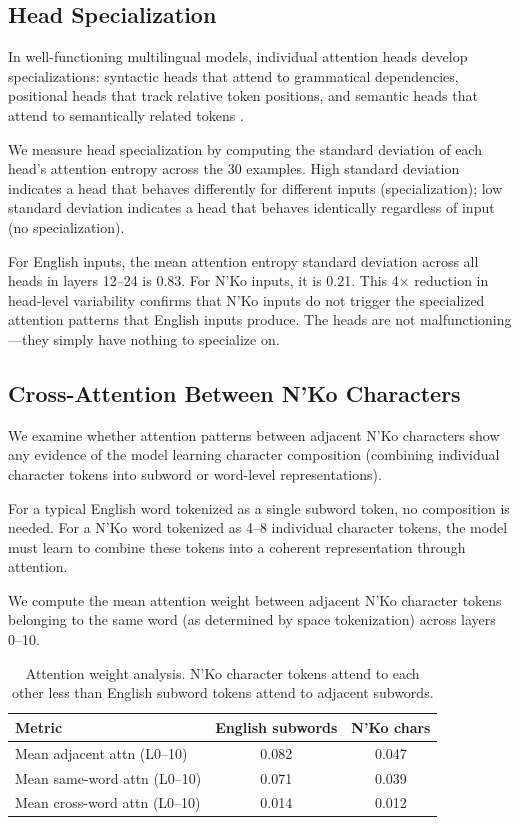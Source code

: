\documentclass[11pt]{article}
\begin{document}
\subsection{Head Specialization}

In well-functioning multilingual models, individual attention heads develop specializations: syntactic heads that attend to grammatical dependencies, positional heads that track relative token positions, and semantic heads that attend to semantically related tokens \cite{clark2019attention}.

We measure head specialization by computing the standard deviation of each head's attention entropy across the 30 examples.
High standard deviation indicates a head that behaves differently for different inputs (specialization); low standard deviation indicates a head that behaves identically regardless of input (no specialization).

For English inputs, the mean attention entropy standard deviation across all heads in layers 12--24 is 0.83.
For N'Ko inputs, it is 0.21.
This 4$\times$ reduction in head-level variability confirms that N'Ko inputs do not trigger the specialized attention patterns that English inputs produce.
The heads are not malfunctioning---they simply have nothing to specialize on.

\subsection{Cross-Attention Between N'Ko Characters}

We examine whether attention patterns between adjacent N'Ko characters show any evidence of the model learning character composition (combining individual character tokens into subword or word-level representations).

For a typical English word tokenized as a single subword token, no composition is needed.
For a N'Ko word tokenized as 4--8 individual character tokens, the model must learn to combine these tokens into a coherent representation through attention.

We compute the mean attention weight between adjacent N'Ko character tokens belonging to the same word (as determined by space tokenization) across layers 0--10.

\begin{table}[t]
\centering
\small
\begin{tabular}{lcc}
\toprule
\textbf{Metric} & \textbf{English subwords} & \textbf{N'Ko chars} \\
\midrule
Mean adjacent attn (L0--10) & 0.082 & 0.047 \\
Mean same-word attn (L0--10) & 0.071 & 0.039 \\
Mean cross-word attn (L0--10) & 0.014 & 0.012 \\
\bottomrule
\end{tabular}
\caption{Attention weight analysis. N'Ko character tokens attend to each other less than English subword tokens attend to adjacent subwords.}
\label{tab:cross-attention}
\end{table}
\end{document}
